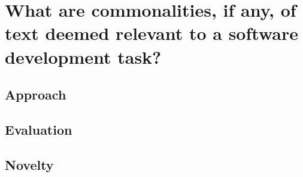 

\section{What are commonalities, if any, of text deemed relevant to a software development task?}



\subsection{Approach}



\subsection{Evaluation}



\subsection{Novelty}